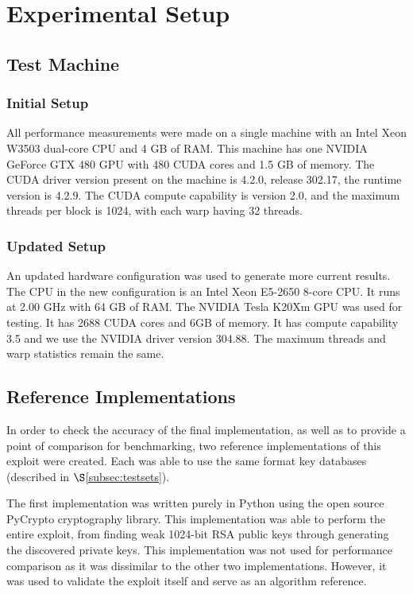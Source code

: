 \documentclass[smallextended]{svjour3}       %
\begin{document}

\section{Experimental Setup}
\label{sec:expsetup}

\subsection{Test Machine}
\label{subsec:testmachine}

\subsubsection{Initial Setup}
\label{subsubsec:initsetup}
All performance measurements were made on a single machine with an Intel Xeon 
W3503 dual-core CPU and 4 GB of RAM. This machine has one NVIDIA GeForce
GTX 480 GPU with 480 CUDA cores and 1.5 GB of memory. The CUDA driver 
version present on the machine is 4.2.0, release 302.17, the runtime version is
4.2.9. The CUDA compute capability is version 2.0, and the maximum threads per 
block is 1024, with each warp having 32 threads.

\subsubsection{Updated Setup}
\label{subsubsec:updatedsetup}
An updated hardware configuration was used to generate more current results.
The CPU in the new configuration is an Intel Xeon E5-2650 8-core CPU. It runs at
2.00 GHz with 64 GB of RAM. The NVIDIA Tesla K20Xm GPU was used for testing. It
has 2688 CUDA cores and 6GB of memory. It has compute capability 3.5 and we use
the NVIDIA driver version 304.88. The maximum threads and warp statistics
remain the same.

\subsection{Reference Implementations}
\label{subsec:refimpl}
In order to check the accuracy of the final implementation, as well as to 
provide a point of comparison for benchmarking, two reference implementations 
of this exploit were created. Each was able to use the same format key 
databases (described in $\S$\ref{subsec:testsets}). 

The first implementation was written purely in Python using the open source
PyCrypto cryptography library. This implementation was able to perform the
entire exploit, from finding weak 1024-bit RSA public keys through generating
the discovered private keys. This implementation was not used for performance
comparison as it was dissimilar to the other two implementations. However, it
was used to validate the exploit itself and serve as an algorithm reference.
\end{document}
